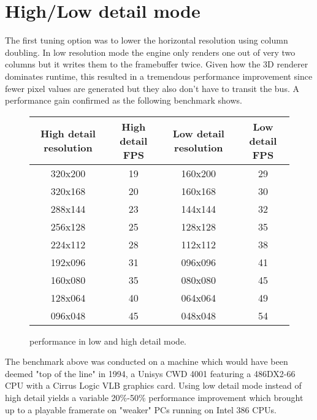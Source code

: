 \section{High/Low detail mode}
The first tuning option was to lower the horizontal resolution using column doubling. In low resolution mode the engine only renders one out of very two columns but it writes them to the framebuffer twice. Given how the 3D renderer dominates runtime, this resulted in a tremendous performance improvement since fewer pixel values are generated but they also don't have to transit the bus.  A performance gain confirmed as the following benchmark shows.\\
\par
 \vspace{0.5cm}
\begin{figure}[H]
\centering  
\begin{tabularx}{\textwidth}{ C{1} C{1} C{1} C{1} } 
  \toprule
  \textbf{High detail resolution} & \textbf{High detail FPS} &  \textbf{Low detail resolution}  & \textbf{Low detail FPS}\\
  \toprule 
320x200  &  19   & 160x200  &       29 \\
320x168  &  20   & 160x168  &       30 \\
288x144  &  23   & 144x144  &       32 \\
256x128  &  25   & 128x128  &       35 \\
224x112  &  28   & 112x112  &       38 \\
192x096  &  31   & 096x096  &       41 \\
160x080  &  35   & 080x080  &       45 \\
128x064  &  40   & 064x064  &       49 \\
096x048  &  45   & 048x048  &       54 \\
  \toprule
\end{tabularx}
\caption{\doom{} performance in low and high detail mode.}
\end{figure}
The benchmark above was conducted on a machine which would have been deemed "top of the line" in 1994, a Unisys CWD 4001 featuring a 486DX2-66 CPU with a Cirrus Logic VLB graphics card. Using low detail mode instead of high detail yields a variable 20\%-50\% performance improvement which brought \doom{} up to a playable framerate on "weaker" PCs running on Intel 386 CPUs.


